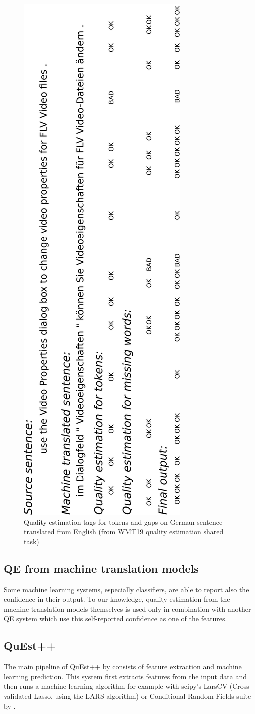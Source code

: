 \begin{figure}[ht]
  \centering
  \includegraphics[height=\textwidth, angle=-90]{img/quality_estimation/format_pdfa1a.pdf}
  \caption{\label{fig:word_level_gaps} Quality estimation tags for tokens and gaps on German sentence translated from English (from WMT19 quality estimation shared task)}
\end{figure}

\pagebreak
\subsection{QE from machine translation models}
Some machine learning systems, especially classifiers, are able to report also the confidence in their output. To our knowledge, quality estimation from the machine translation models themselves is used only in combination with another QE system which use this self-reported confidence as one of the features.

\subsection{QuEst++}
The main pipeline of QuEst++ by \cite{questplusplus} consists of feature extraction and machine learning prediction. This system first extracts features from the input data and then runs a machine learning algorithm for example with scipy's LarsCV (Cross-validated Lasso, using the LARS algorithm) or Conditional Random Fields suite by \cite{CRFSuite}.

